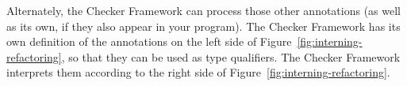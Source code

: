 Alternately, the Checker Framework can process those other annotations (as
well as its own, if they also appear in your program).  The Checker
Framework has its own definition of the annotations on the left side of
Figure~\ref{fig:interning-refactoring}, so that they can be used as type
qualifiers.  The Checker Framework interprets them according to the right
side of Figure~\ref{fig:interning-refactoring}.



